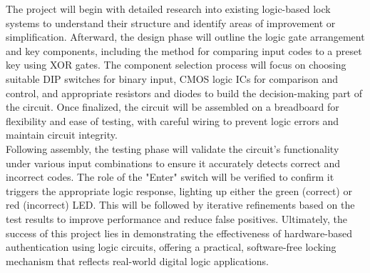\noindent The project will begin with detailed research into existing logic-based lock systems to understand their structure and identify areas of improvement or simplification. Afterward, the design phase will outline the logic gate arrangement and key components, including the method for comparing input codes to a preset key using XOR gates. The component selection process will focus on choosing suitable DIP switches for binary input, CMOS logic ICs for comparison and control, and appropriate resistors and diodes to build the decision-making part of the circuit. Once finalized, the circuit will be assembled on a breadboard for flexibility and ease of testing, with careful wiring to prevent logic errors and maintain circuit integrity.\\

\noindent Following assembly, the testing phase will validate the circuit's functionality under various input combinations to ensure it accurately detects correct and incorrect codes. The role of the "Enter" switch will be verified to confirm it triggers the appropriate logic response, lighting up either the green (correct) or red (incorrect) LED. This will be followed by iterative refinements based on the test results to improve performance and reduce false positives. Ultimately, the success of this project lies in demonstrating the effectiveness of hardware-based authentication using logic circuits, offering a practical, software-free locking mechanism that reflects real-world digital logic applications.\cite{2.2}\\

